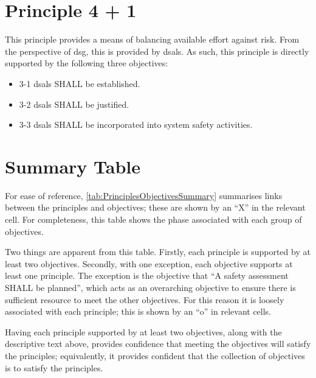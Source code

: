 \section{Principle 4 + 1}

This principle provides a means of balancing available effort against risk. From the perspective of \gls{dsg}, this is provided by \glspl{dsal}. As such, this principle is directly supported by the following three objectives:

\begin{itemize}
	\item \textcolor{dsiwgAccentColour}{3-1} \Glspl{dsal} SHALL be established.
	\item \textcolor{dsiwgAccentColour}{3-2} \Glspl{dsal} SHALL be justified.
	\item \textcolor{dsiwgAccentColour}{3-3} \Glspl{dsal} SHALL be incorporated into system safety activities.
\end{itemize}


\section{Summary Table}

For ease of reference, \autoref{tab:PrinciplesObjectivesSummary} summarises links between the principles and objectives; these are shown by an ``X'' in the relevant cell. For completeness, this table shows the phase associated with each group of objectives. 

Two things are apparent from this table. Firstly, each principle is supported by at least two objectives. Secondly, with one exception, each objective supports at least one principle. The exception is the objective that ``A \gls{safety assessment} SHALL be planned'', which acts as an overarching objective to ensure there is sufficient resource to meet the other objectives. For this reason it is loosely associated with each principle; this is shown by an ``o'' in relevant cells.

Having each principle supported by at least two objectives, along with the descriptive text above, provides confidence that meeting the objectives will satisfy the principles; equivalently, it provides confident that the collection of objectives is  to satisfy the principles. 

